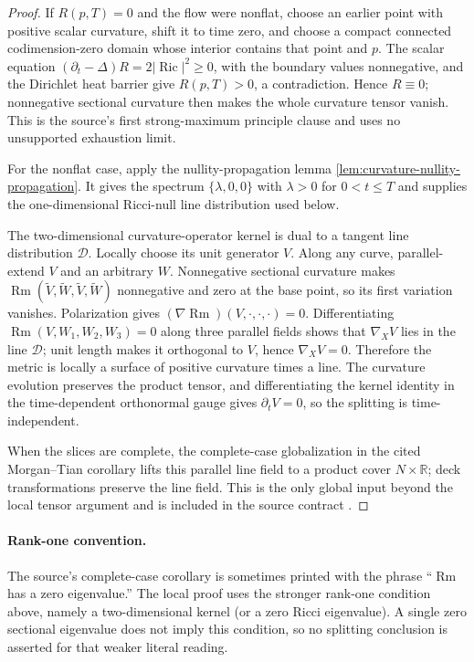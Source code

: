 \begin{proof}
If $R(p,T)=0$ and the flow were nonflat, choose an earlier point with
positive scalar curvature, shift it to time zero, and choose a compact
connected codimension-zero domain whose interior contains that point and
$p$.  The scalar equation
$(\partial_t-\Delta)R=2|\operatorname{Ric}|^2\ge0$, with the boundary values
nonnegative, and the Dirichlet heat barrier give $R(p,T)>0$, a contradiction.
Hence $R\equiv0$; nonnegative sectional curvature then makes the whole
curvature tensor vanish.  This is the source's first strong-maximum
principle clause and uses no unsupported exhaustion limit.

For the nonflat case, apply the nullity-propagation lemma
\ref{lem:curvature-nullity-propagation}.  It gives the spectrum
$\{\lambda,0,0\}$ with $\lambda>0$ for $0<t\le T$ and supplies the
one-dimensional Ricci-null line distribution used below.

The two-dimensional curvature-operator kernel is dual to a tangent line
distribution $\mathcal D$.  Locally choose its unit generator $V$.  Along
any curve, parallel-extend $V$ and an arbitrary $W$.  Nonnegative sectional
curvature makes
$\operatorname{Rm}(\widetilde V,\widetilde W,\widetilde V,\widetilde W)$
nonnegative and zero at the base point, so its first variation vanishes.
Polarization gives $(\nabla\operatorname{Rm})(V,\cdot,\cdot,\cdot)=0$.
Differentiating
$\operatorname{Rm}(V,W_1,W_2,W_3)=0$ along three parallel fields shows that
$\nabla_XV$ lies in the line $\mathcal D$; unit length makes it orthogonal
to $V$, hence $\nabla_XV=0$.  Therefore the metric is locally a surface
of positive curvature times a line.  The curvature evolution preserves the
product tensor, and differentiating the kernel identity in the
time-dependent orthonormal gauge gives $\partial_tV=0$, so the splitting is
time-independent.

When the slices are complete, the complete-case globalization in the cited
Morgan--Tian corollary lifts this parallel line field to a product cover
$N\times\mathbb R$; deck transformations preserve the line field.  This is
the only global input beyond the local tensor argument and is included in
the source contract .
\end{proof}

\paragraph{Rank-one convention.}
The source's complete-case corollary is sometimes printed with the phrase
``$\operatorname{Rm}$ has a zero eigenvalue.''  The local proof uses the
stronger rank-one condition above, namely a two-dimensional kernel (or a
zero Ricci eigenvalue).  A single zero sectional eigenvalue does not imply
this condition, so no splitting conclusion is asserted for that weaker
literal reading.

